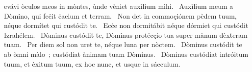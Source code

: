 \psalmChapterWithInscription{}
{ }
{%
evávi òculos meos in mòntes, ùnde vèniet auxìlium mìhi. 
~Auxìlium meum a Dòmino, qui feċit ċaelum et terram. 
~Non det in commoçiónem pèdem tuum, néque dormítet qui custódit te. 
~Ecċe non dormitábit néque dórmiet qui custódit Izrahélem. 
~Dòminus custódit te, Dòminus protécçio tua super mànum dèxteram tuam. 
~Per diem sol non uret te, néque luna per nòctem. 
~Dòminus custódit te ab òmni màlo~; custódiat ànimam tuam Dòminus. 
~Dòminus custódiat intróitum tuum, et èxitum tuum, ex hoc nunc, et usque in sáeculum. 
}
